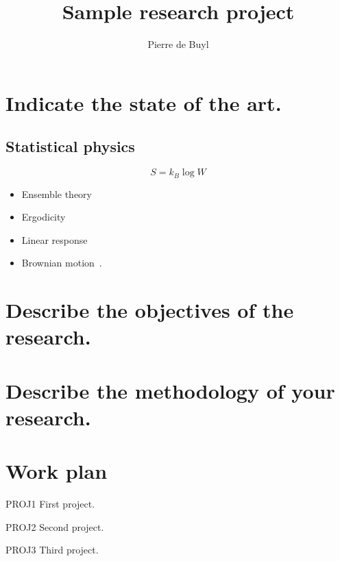 \documentclass{fwoapplication}
\author{Pierre de Buyl}
\title{Sample research project}
\date{}
\begin{document}
\maketitle

\section{Indicate the state of the art.}


\subsection{Statistical physics}

\begin{equation*}
S = k_B \log W
\end{equation*}

\begin{itemize}
\item Ensemble theory
\item Ergodicity
\item Linear response
\item Brownian motion~\cite{einstein_brownian_1905}.
\end{itemize}



\section{Describe the objectives of the research.}



\section{Describe the methodology of your research.}


\section{Work plan}


\begin{compactdesc}
\item[PROJ1] First project.
\item[PROJ2] Second project.
\item[PROJ3] Third project. 
\end{compactdesc}
\end{document}
